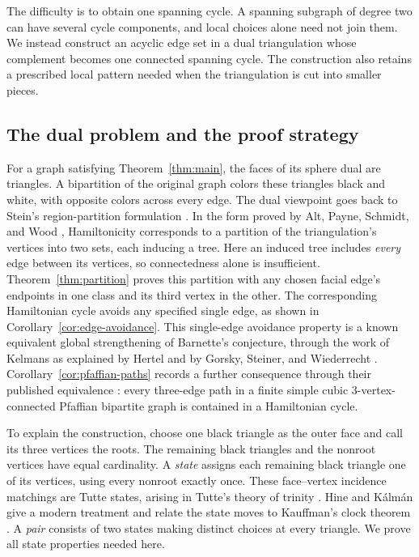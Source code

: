 \documentclass[11pt]{article}
\theoremstyle{remark}
\numberwithin{equation}{section}
\begin{document}
The difficulty is to obtain one spanning cycle. A spanning subgraph
of degree two can have several cycle components, and local choices
alone need not join them. We instead construct an acyclic edge set
in a dual triangulation whose complement becomes one connected
spanning cycle. The construction also retains a prescribed local
pattern needed when the triangulation is cut into smaller pieces.

\subsection{The dual problem and the proof strategy}

For a graph satisfying Theorem~\ref{thm:main}, the faces of its sphere
dual are triangles.
A bipartition of the original graph colors these triangles black
and white, with opposite colors across every edge. The dual viewpoint goes back to Stein's region-partition formulation
\cite[Theorem~2.2]{Stein1971}. In the form proved by Alt, Payne,
Schmidt, and Wood \cite[Lemma~5]{APSW2016}, Hamiltonicity corresponds
to a partition of the triangulation's vertices into two sets, each
inducing a tree. Here an induced tree includes \emph{every}
edge between its vertices, so connectedness alone is insufficient.
Theorem~\ref{thm:partition} proves this partition with any chosen
facial edge's endpoints in one class and its third vertex in the
other. The corresponding Hamiltonian cycle avoids any specified
single edge, as shown in Corollary~\ref{cor:edge-avoidance}. This
single-edge avoidance property is a known equivalent global
strengthening of Barnette's conjecture, through the work of Kelmans
as explained by Hertel \cite[Corollary~3]{Hertel2005} and by
Gorsky, Steiner, and Wiederrecht \cite[Theorem~4.3]{GSW2023}.
Corollary~\ref{cor:pfaffian-paths} records a further consequence
through their published equivalence \cite[Theorem~4.16]{GSW2023}:
every three-edge path in a finite simple cubic \(3\)-vertex-connected Pfaffian
bipartite graph is contained in a Hamiltonian cycle.

To explain the construction, choose one black triangle as the outer
face and call its three vertices the roots. The remaining black
triangles and the nonroot vertices have equal cardinality. A
\emph{state} assigns each remaining black triangle one of its vertices,
using every nonroot exactly once. These face--vertex incidence
matchings are Tutte states, arising in Tutte's theory of trinity
\cite{Tutte1975}. Hine and K\'alm\'an give a modern treatment and
relate the state moves to Kauffman's clock theorem \cite{HK2018}.
A \emph{pair} consists of two states making distinct
choices at every triangle. We prove all state properties needed here.
\end{document}
